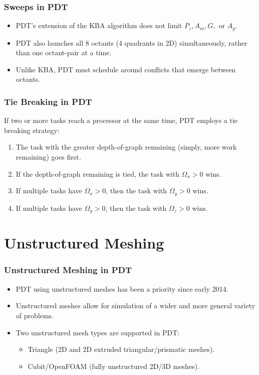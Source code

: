 \documentclass[xcolor={usenames,dvipsnames,svgnames,table}]{beamer}
\begin{document}
\begin{frame}[t]\frametitle{Sweeps in PDT}
\begin{block}{}
\begin{itemize}
\item PDT's extension of the KBA algorithm does not limit $P_z, A_m, G,$ or $A_g$.
\item PDT also launches all 8 octants (4 quadrants in 2D) simultaneously, rather than one octant-pair at a time.
\item Unlike KBA, PDT must schedule around conflicts that emerge between octants.
\end{itemize}
\end{block}
\end{frame}

\begin{frame}[t]\frametitle{Tie Breaking in PDT}

\begin{block}{If two or more tasks reach a processor at the same time, PDT employs a tie breaking strategy:}

\begin{enumerate}
	\item The task with the greater depth-of-graph remaining (simply, more work remaining) goes first.
	\item If the depth-of-graph remaining is tied, the task with $\Omega_x > 0$ wins.
	\item If multiple tasks have $\Omega_x > 0$, then the task with $\Omega_y > 0$ wins.
	\item If multiple tasks have $\Omega_y > 0$, then the task with $\Omega_z > 0$ wins.
\end{enumerate}
\end{block}
\end{frame}

\section{Unstructured Meshing}

\begin{frame}[t]\frametitle{Unstructured Meshing in PDT}
  \begin{block}{}
    \begin{itemize}
      \item PDT using unstructured meshes has been a priority since early 2014. 
      \item Unstructured meshes allow for simulation of a wider and more general variety of problems.
      \item Two unstructured mesh types are supported in PDT:
        \begin{itemize}
          \item Triangle (2D and 2D extruded triangular/prismatic meshes).
          \item Cubit/OpenFOAM (fully unstructured 2D/3D meshes).
        \end{itemize}
    \end{itemize}
  \end{block}
\end{frame}
\end{document}
